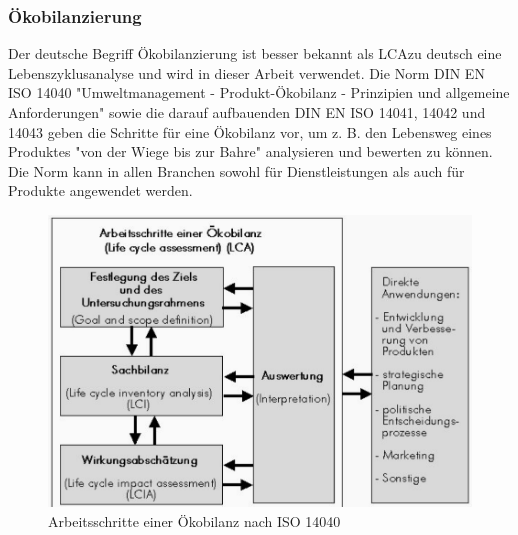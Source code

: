 \documentclass[a4paper, 12pt, twoside, BCOR=20mm, DIV=calc, abstracton, parskip=half*, toc=bibliography, toc=listof, headsepline, footsepline, headings=small, numbers=enddot]{scrreprt}
\begin{document}
\subsubsection{Ökobilanzierung}
Der deutsche Begriff Ökobilanzierung ist besser bekannt als \ac{LCA}zu deutsch eine Lebenszyklusanalyse und wird in dieser Arbeit verwendet\cite{klopffer2009okobilanz}.
Die Norm DIN EN ISO 14040 "Umweltmanagement - Produkt-Ökobilanz - Prinzipien und allgemeine Anforderungen" sowie die darauf aufbauenden DIN EN ISO 14041, 14042 und 14043 geben die Schritte für eine Ökobilanz vor, um z. B. den Lebensweg eines Produktes "von der Wiege bis zur Bahre" analysieren und bewerten zu können. Die Norm kann in allen Branchen sowohl für Dienstleistungen als auch für Produkte angewendet werden.
\begin{figure}
\centering
\includegraphics[width=\textwidth]{Bild/ISO 14040 Oekobilanz1.pdf}
\caption{Arbeitsschritte einer Ökobilanz nach ISO 14040\cite{klopffer2009okobilanz}}
\end{figure}
\end{document}
